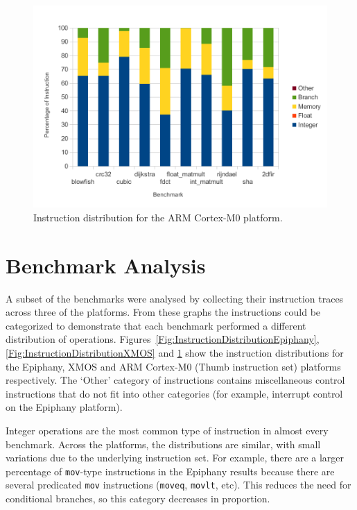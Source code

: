 \documentclass[twocolumn]{article}
\begin{document}
\begin{figure}[t]
	\includegraphics[width=\linewidth]{arm.pdf}
	\caption{Instruction distribution for the ARM Cortex-M0 platform.}
	\label{Fig:InstructionDistributionARM}
\end{figure}

\section{Benchmark Analysis}

A subset of the benchmarks were analysed by collecting their instruction traces across three of the platforms. From these graphs the instructions could be categorized to demonstrate that each benchmark performed a different distribution of operations. Figures~\ref{Fig:InstructionDistributionEpiphany}, \ref{Fig:InstructionDistributionXMOS} and \ref{Fig:InstructionDistributionARM} show the instruction distributions for the Epiphany, XMOS and ARM Cortex-M0 (Thumb instruction set) platforms respectively. The `Other' category of instructions contains miscellaneous control instructions that do not fit into other categories (for example, interrupt control on the Epiphany platform).

Integer operations are the most common type of instruction in almost every benchmark. Across the platforms, the distributions are similar, with small variations due to the underlying instruction set. For example, there are a larger percentage of \texttt{mov}-type instructions in the Epiphany results because there are several predicated \texttt{mov} instructions (\texttt{moveq}, \texttt{movlt}, etc). This reduces the need for conditional branches, so this category decreases in proportion.
\end{document}
